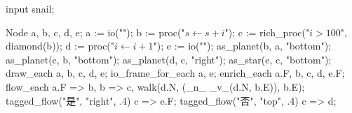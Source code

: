 \usemodule[zhfonts]

\startMPpage
input snail;

Node a, b, c, d, e;
a := io("");
b := proc("$s\leftarrow s + i$");
c := rich_proc("$i > 100$", diamond(b));
d := proc("$i\leftarrow i + 1$");
e := io("");
as_planet(b, a, "bottom");
as_planet(c, b, "bottom");
as_planet(d, c, "right");
as_star(e, c, "bottom");
draw_each a, b, c, d, e;
io_frame_for_each a, e;
enrich_each a.F, b, c, d, e.F;
flow_each a.F => b, b => c, walk(d.N, (_n_ _v_(d.N, b.E)), b.E);
tagged_flow("是", "right", .4) c => e.F;
tagged_flow("否", "top", .4) c => d;
\stopMPpage